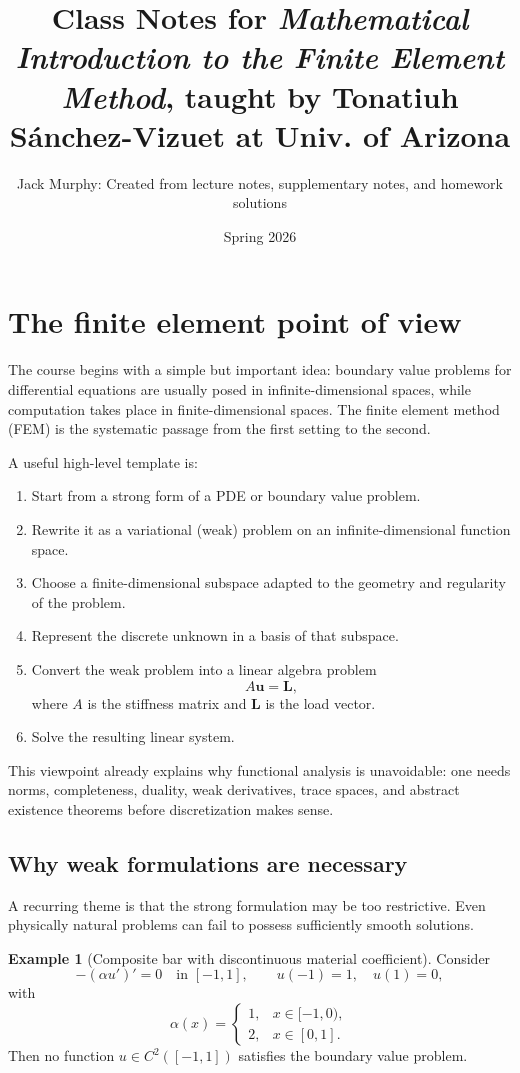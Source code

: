 \documentclass[11pt]{article}
\title{Class Notes for \emph{Mathematical Introduction to the Finite Element Method}, taught by Tonatiuh Sánchez-Vizuet at Univ. of Arizona}
\author{Jack Murphy: Created from lecture notes, supplementary notes, and homework solutions}
\date{Spring 2026}
\theoremstyle{definition}
\newtheorem{example}[theorem]{Example}
\begin{document}
\maketitle
\tableofcontents
\newpage

\section{The finite element point of view}

The course begins with a simple but important idea: boundary value problems for differential equations are usually posed in infinite-dimensional spaces, while computation takes place in finite-dimensional spaces. The finite element method (FEM) is the systematic passage from the first setting to the second.

A useful high-level template is:
\begin{enumerate}
    \item Start from a strong form of a PDE or boundary value problem.
    \item Rewrite it as a variational (weak) problem on an infinite-dimensional function space.
    \item Choose a finite-dimensional subspace adapted to the geometry and regularity of the problem.
    \item Represent the discrete unknown in a basis of that subspace.
    \item Convert the weak problem into a linear algebra problem
    \[
        A\mathbf{u} = \mathbf{L},
    \]
    where $A$ is the stiffness matrix and $\mathbf{L}$ is the load vector.
    \item Solve the resulting linear system.
\end{enumerate}

This viewpoint already explains why functional analysis is unavoidable: one needs norms, completeness, duality, weak derivatives, trace spaces, and abstract existence theorems before discretization makes sense.

\subsection{Why weak formulations are necessary}

A recurring theme is that the strong formulation may be too restrictive. Even physically natural problems can fail to possess sufficiently smooth solutions.

\begin{example}[Composite bar with discontinuous material coefficient]
Consider
\[
-(\alpha u')' = 0 \quad \text{in } [-1,1],
\qquad u(-1)=1,\quad u(1)=0,
\]
with
\[
\alpha(x)=
\begin{cases}
1, & x\in[-1,0),\\
2, & x\in[0,1].
\end{cases}
\]
Then no function $u\in C^2([-1,1])$ satisfies the boundary value problem.
\end{example}
\end{document}
